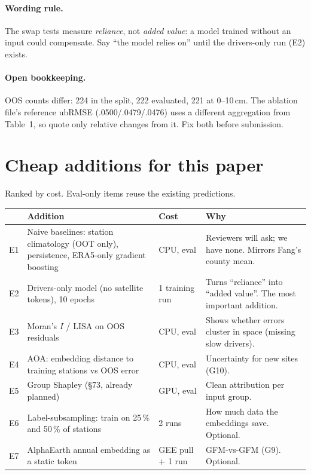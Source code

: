 \documentclass[11pt,a4paper]{article}
\begin{document}
\paragraph{Wording rule.} The swap tests measure \emph{reliance}, not \emph{added value}: a model
trained without an input could compensate. Say ``the model relies on'' until the drivers-only run
(E2) exists.

\paragraph{Open bookkeeping.} OOS counts differ: 224 in the split, 222 evaluated, 221 at 0--10\,cm.
The ablation file's reference ubRMSE (.0500/.0479/.0476) uses a different aggregation from Table~1,
so quote only relative changes from it. Fix both before submission.

\section{Cheap additions for this paper}
Ranked by cost. Eval-only items reuse the existing predictions.

\begin{table}[h]
\centering\small
\begin{tabularx}{\linewidth}{@{}l Y l Y@{}}
\toprule
 & Addition & Cost & Why \\
\midrule
E1 & Naive baselines: station climatology (OOT only), persistence, ERA5-only gradient boosting & CPU, eval & Reviewers will ask; we have none. Mirrors Fang's county mean. \\
E2 & Drivers-only model (no satellite tokens), 10 epochs & 1 training run & Turns ``reliance'' into ``added value''. The most important addition. \\
E3 & Moran's $I$ / LISA on OOS residuals & CPU, eval & Shows whether errors cluster in space (missing slow drivers). \\
E4 & AOA: embedding distance to training stations vs OOS error & CPU, eval & Uncertainty for new sites (G10). \\
E5 & Group Shapley (\S73, already planned) & GPU, eval & Clean attribution per input group. \\
E6 & Label-subsampling: train on 25\,\% and 50\,\% of stations & 2 runs & How much data the embeddings save. Optional. \\
E7 & AlphaEarth annual embedding as a static token & GEE pull + 1 run & GFM-vs-GFM (G9). Optional. \\
\bottomrule
\end{tabularx}
\end{table}
\end{document}
